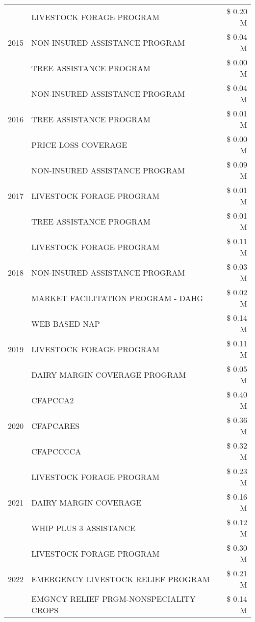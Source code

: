 \begin{tabular}{llr}
\cline{1-3}
\multirow[t]{3}{*}{2015} & LIVESTOCK FORAGE PROGRAM & \$ 0.20 M \\
 & NON-INSURED ASSISTANCE PROGRAM & \$ 0.04 M \\
 & TREE ASSISTANCE PROGRAM & \$ 0.00 M \\
\cline{1-3}
\multirow[t]{3}{*}{2016} & NON-INSURED ASSISTANCE PROGRAM & \$ 0.04 M \\
 & TREE ASSISTANCE PROGRAM & \$ 0.01 M \\
 & PRICE LOSS COVERAGE & \$ 0.00 M \\
\cline{1-3}
\multirow[t]{3}{*}{2017} & NON-INSURED ASSISTANCE PROGRAM & \$ 0.09 M \\
 & LIVESTOCK FORAGE PROGRAM & \$ 0.01 M \\
 & TREE ASSISTANCE PROGRAM & \$ 0.01 M \\
\cline{1-3}
\multirow[t]{3}{*}{2018} & LIVESTOCK FORAGE PROGRAM & \$ 0.11 M \\
 & NON-INSURED ASSISTANCE PROGRAM & \$ 0.03 M \\
 & MARKET FACILITATION PROGRAM - DAHG & \$ 0.02 M \\
\cline{1-3}
\multirow[t]{3}{*}{2019} & WEB-BASED NAP & \$ 0.14 M \\
 & LIVESTOCK FORAGE PROGRAM & \$ 0.11 M \\
 & DAIRY MARGIN COVERAGE PROGRAM & \$ 0.05 M \\
\cline{1-3}
\multirow[t]{3}{*}{2020} & CFAPCCA2 & \$ 0.40 M \\
 & CFAPCARES & \$ 0.36 M \\
 & CFAPCCCCA & \$ 0.32 M \\
\cline{1-3}
\multirow[t]{3}{*}{2021} & LIVESTOCK FORAGE PROGRAM & \$ 0.23 M \\
 & DAIRY MARGIN COVERAGE & \$ 0.16 M \\
 & WHIP PLUS 3 ASSISTANCE & \$ 0.12 M \\
\cline{1-3}
\multirow[t]{3}{*}{2022} & LIVESTOCK FORAGE PROGRAM & \$ 0.30 M \\
 & EMERGENCY LIVESTOCK RELIEF PROGRAM & \$ 0.21 M \\
 & EMGNCY RELIEF PRGM-NONSPECIALITY CROPS & \$ 0.14 M \\
\cline{1-3}
\bottomrule
\end{tabular}
